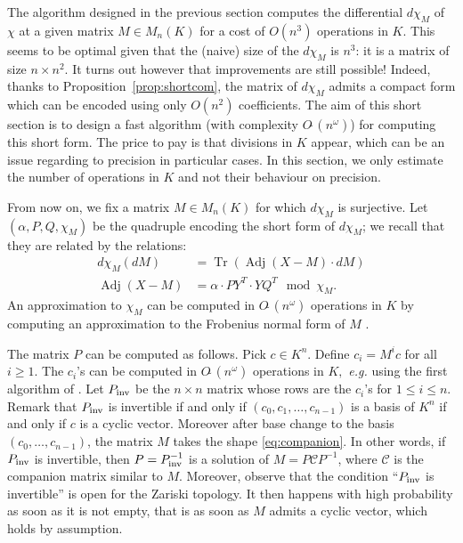 \documentclass{sig-alternate-05-2015}
\DeclareMathOperator{\tr}{Tr}
\DeclareMathOperator{\adj}{Adj}
\newcommand{\softO}{O\tilde{~}}
\newcommand{\inv}{\text{\rm inv}}
\begin{document}
The algorithm designed in the previous section computes the differential 
$d \chi_M$ of $\chi$ at a given matrix $M \in M_n(K)$ for a cost of 
$O(n^3)$ operations in $K$. This seems to be optimal given that the 
(naive) size of the $d \chi_M$ is $n^3$: it is a matrix of size $n
\times n^2$. It turns out however that improvements are still possible!
Indeed, thanks to Proposition~\ref{prop:shortcom}, the matrix of 
$d \chi_M$ admits a compact form which can be encoded using only $O(n^2)$ 
coefficients. The aim of this short section is to design a fast 
algorithm (with complexity $\softO(n^\omega)$) for computing this short 
form. The price to pay is that divisions in $K$ appear, which can be an 
issue regarding to precision in particular cases.
In this section, we only estimate the number of operations in $K$
and not their behaviour on precision.

From now on, we fix a matrix $M \in M_n(K)$ for which $d \chi_M$ is 
surjective. Let $(\alpha, P, Q, \chi_M)$ be the quadruple encoding
the short form of $d \chi_M$; we recall that they are related by the
relations:
\begin{align*}
d \chi_M(dM) & =\tr(\adj(X{-}M) \cdot dM) \\
\adj(X{-}M) & = \alpha \cdot P Y^T \cdot Y Q^T \mod \chi_M.
\end{align*}
An approximation to $\chi_M$ can be computed in $\softO(n^\omega)$ operations in $K$
by computing an approximation to the Frobenius normal form of $M$ \cite{storjohann:01a}.

The matrix $P$ can be computed as follows. Pick $c \in K^n$. Define 
$c_i = M^i c$ for all $i \geq 1$. The $c_i$'s can be computed in 
$\softO(n^\omega)$ operations in $K,$ \textit{e.g.}
using the first algorithm
of \cite{keller-gehrig:85a}. Let $P_\inv$ be the 
$n \times n$ matrix whose rows are the $c_i$'s for $1 \leq i \leq n$. 
Remark that $P_\inv$ is invertible if and only if $(c_0, c_1, \ldots, 
c_{n-1})$ is a basis of $K^n$ if and only if $c$ is a cyclic vector. 
Moreover after base change to the basis $(c_0, \ldots, c_{n-1})$, the matrix 
$M$ takes the shape \eqref{eq:companion}. In other words, if $P_\inv$
is invertible, then $P = P_\inv^{-1}$ is a solution of $M = P \mathscr{C} P^{-1}$,
where $\mathscr{C}$ is the companion matrix similar to $M$.
Moreover, observe that the condition ``$P_\inv$ is invertible'' is open
for the Zariski topology. It then happens with high probability as soon
as it is not empty, that is as soon as $M$ admits a cyclic vector, which
holds by assumption.
\end{document}
